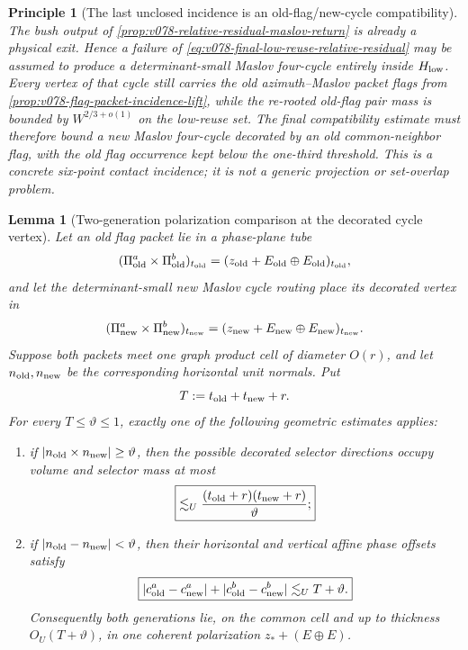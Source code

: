 \documentclass[10pt]{article}
\newtheorem{lemma}[theorem]{Lemma}
\newtheorem{principle}[theorem]{Principle}
\begin{document}
\begin{principle}[The last unclosed incidence is an old-flag/new-cycle compatibility]
\label{pr:v078-final-six-point-compatibility}
The bush output of \cref{prop:v078-relative-residual-maslov-return} is already a physical exit.
Hence a failure of \eqref{eq:v078-final-low-reuse-relative-residual} may be assumed to produce a
determinant-small Maslov four-cycle entirely inside \(H_{\rm low}\).  Every vertex of that cycle
still carries the old azimuth--Maslov packet flags from
\cref{prop:v078-flag-packet-incidence-lift}, while the re-rooted old-flag pair mass is bounded by
\(W^{2/3+o(1)}\) on the low-reuse set.  The final compatibility estimate must therefore bound a
new Maslov four-cycle decorated by an old common-neighbor flag, with the old flag occurrence kept
below the one-third threshold.  This is a concrete six-point contact incidence; it is not a
generic projection or set-overlap problem.
\end{principle}

\begin{lemma}[Two-generation polarization comparison at the decorated cycle vertex]
\label{lem:v078-old-flag-new-cycle-polarization}
Let an old flag packet lie in a phase-plane tube
\[
(\Pi_{\rm old}^a\times\Pi_{\rm old}^b)_{t_{\rm old}}
=
(z_{\rm old}+E_{\rm old}\oplus E_{\rm old})_{t_{\rm old}},
\]
and let the determinant-small new Maslov cycle routing place its decorated vertex in
\[
(\Pi_{\rm new}^a\times\Pi_{\rm new}^b)_{t_{\rm new}}
=
(z_{\rm new}+E_{\rm new}\oplus E_{\rm new})_{t_{\rm new}}.
\]
Suppose both packets meet one graph product cell of diameter \(O(r)\), and let
\(n_{\rm old},n_{\rm new}\) be the corresponding horizontal unit normals.  Put
\[
T:=t_{\rm old}+t_{\rm new}+r.
\]
For every \(T\le\vartheta\le1\), exactly one of the following geometric estimates applies:
\begin{enumerate}[label=\textnormal{(\roman*)}]
\item if \(|n_{\rm old}\times n_{\rm new}|\ge\vartheta\), then the possible decorated selector
directions occupy volume and selector mass at most
\begin{equation}
\label{eq:v078-two-generation-transverse-cost}
\boxed{
\lesssim_U
\frac{(t_{\rm old}+r)(t_{\rm new}+r)}{\vartheta};
}
\end{equation}
\item if \(|n_{\rm old}-n_{\rm new}|<\vartheta\), then their horizontal and vertical affine phase
offsets satisfy
\begin{equation}
\label{eq:v078-two-generation-phase-alignment}
\boxed{
|c_{\rm old}^a-c_{\rm new}^a|
+
|c_{\rm old}^b-c_{\rm new}^b|
\lesssim_U
T+\vartheta.
}
\end{equation}
Consequently both generations lie, on the common cell and up to thickness
\(O_U(T+\vartheta)\), in one coherent polarization
\(z_*+(E\oplus E)\).
\end{enumerate}
\end{lemma}
\end{document}
